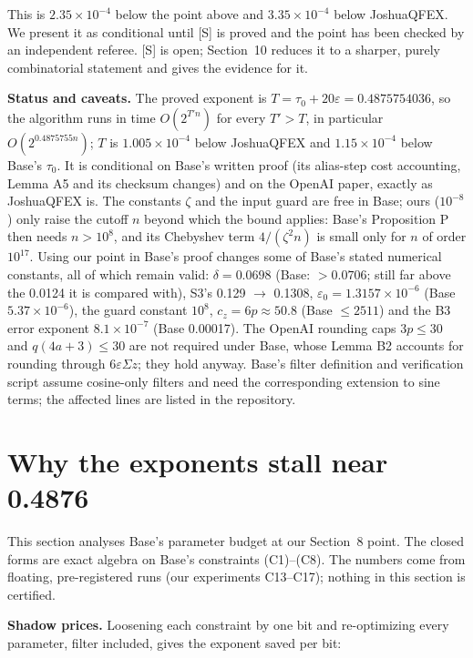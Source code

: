 \documentclass[11pt]{article}
\newcommand{\eps}{\varepsilon}
\theoremstyle{plain}
\begin{document}
This is $2.35\times10^{-4}$ below the point above and $3.35\times10^{-4}$ below JoshuaQFEX. We present it as conditional until [S] is proved and the point has been checked by an independent referee. [S] is open; Section~10 reduces it to a sharper, purely combinatorial statement and gives the evidence for it.

\textbf{Status and caveats.} The proved exponent is $T = \tau_0 + 20\eps = 0.4875754036$, so the algorithm runs in time $O(2^{T' n})$ for every $T' > T$, in particular $O(2^{0.4875755n})$; $T$ is $1.005\times10^{-4}$ below JoshuaQFEX and $1.15\times10^{-4}$ below Base's $\tau_0$. It is conditional on Base's written proof (its alias-step cost accounting, Lemma A5 and its checksum changes) and on the OpenAI paper, exactly as JoshuaQFEX is. The constants $\zeta$ and the input guard are free in Base; ours ($10^{-8}$) only raise the cutoff $n$ beyond which the bound applies: Base's Proposition P then needs $n > 10^8$, and its Chebyshev term $4/(\zeta^2 n)$ is small only for $n$ of order $10^{17}$. Using our point in Base's proof changes some of Base's stated numerical constants, all of which remain valid: $\delta = 0.0698$ (Base: $> 0.0706$; still far above the 0.0124 it is compared with), S3's 0.129 $\to$ 0.1308, $\eps_0 = 1.3157\times10^{-6}$ (Base $5.37\times10^{-6}$), the guard constant $10^8$, $c_z = 6p \approx 50.8$ (Base $\le 2511$) and the B3 error exponent $8.1\times10^{-7}$ (Base 0.00017). The OpenAI rounding caps $3p \le 30$ and $q(4a + 3) \le 30$ are not required under Base, whose Lemma B2 accounts for rounding through $6\eps\Sigma z$; they hold anyway. Base's filter definition and verification script assume cosine-only filters and need the corresponding extension to sine terms; the affected lines are listed in the repository.

\section{Why the exponents stall near 0.4876}

This section analyses Base's parameter budget at our Section~8 point. The closed forms are exact algebra on Base's constraints (C1)--(C8). The numbers come from floating, pre-registered runs (our experiments C13--C17); nothing in this section is certified.

\textbf{Shadow prices.} Loosening each constraint by one bit and re-optimizing every parameter, filter included, gives the exponent saved per bit:
\end{document}
